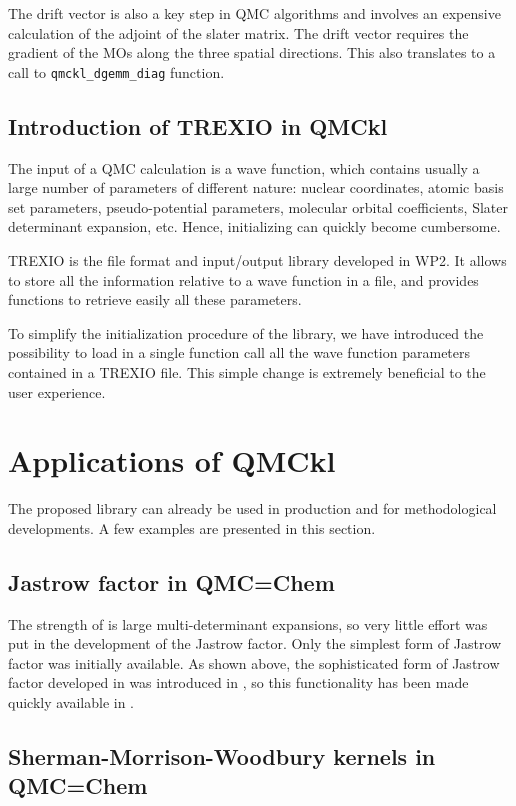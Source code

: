 The drift vector is also a key step in \ac{QMC} algorithms and
involves an expensive calculation of the adjoint of the slater matrix.
The drift vector requires the gradient of the MOs along the three
spatial directions. This also translates to a call to \texttt{qmckl_dgemm_diag} function.

\subsection{Introduction of TREXIO in QMCkl}

The input of a \ac{QMC} calculation is a wave function, which
contains usually a large number of parameters of different nature:
nuclear coordinates, atomic basis set parameters, pseudo-potential
parameters, molecular orbital coefficients, Slater determinant
expansion, etc.
Hence, initializing \QMCkl{} can quickly become cumbersome.

\ac{TREXIO} is the file format and input/output library developed in
\ac{WP}2. It allows to store all the information relative to a wave
function in a file, and provides functions to retrieve easily all
these parameters. 

To simplify the initialization procedure of the library, we have
introduced the possibility to load in a single function call all the
wave function parameters contained in a \ac{TREXIO} file. This simple
change is extremely beneficial to the user experience.


\section{Applications of QMCkl}

The proposed library can already be used in production and for
methodological developments. A few examples are presented in this section.

\subsection{Jastrow factor in QMC=Chem}

The strength of \qmcchem{} is large multi-determinant expansions, so very
little effort was put in the development of the Jastrow factor. Only the
simplest form of Jastrow factor was initially available. As shown above, the
sophisticated form of Jastrow factor developed in \champ{} was introduced
in \QMCkl{}, so this functionality has been made quickly available
in \qmcchem{}.

\subsection{Sherman-Morrison-Woodbury kernels in QMC=Chem}

